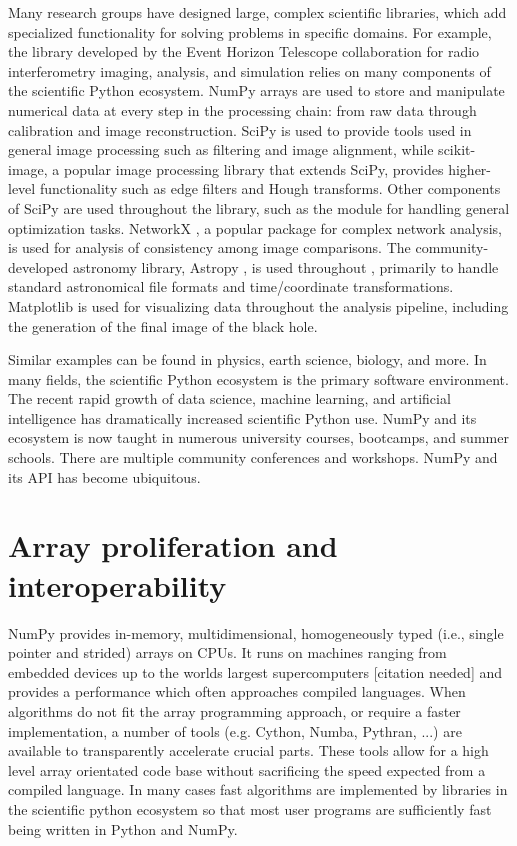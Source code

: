 Many research groups have designed large,
complex scientific libraries, which add specialized functionality for
solving problems in specific domains.
For example, the  library developed by the Event Horizon Telescope 
collaboration for radio interferometry imaging, analysis, and simulation
relies on many components of the scientific Python ecosystem.
NumPy arrays are used to store and manipulate numerical data at every step
in the processing chain: from raw data through calibration and image 
reconstruction.
SciPy is used to provide tools used in general image processing such as 
filtering and image alignment, while scikit-image, a popular image processing
library that extends SciPy, provides higher-level functionality such as
edge filters and Hough transforms.
Other components of SciPy are used throughout the library, such as the
 module for handling general optimization tasks.
NetworkX \cite{SciPyProceedings_11}, a popular package for complex
network analysis, is used for analysis of consistency among image
comparisons.
The community-developed astronomy library, Astropy \cite{astropy:2013, astropy:2018},
is used throughout , primarily to handle standard
astronomical file formats and time/coordinate transformations.
Matplotlib is used for visualizing data throughout the analysis pipeline,
including the generation of the final image of the black hole.

Similar examples can be found in physics, earth science, biology,
and more.
In many fields, the scientific Python ecosystem is the primary
software environment.
The recent rapid growth of data science, machine learning, and
artificial intelligence has dramatically increased scientific
Python use.
NumPy and its ecosystem is now taught in
numerous university courses, bootcamps, and summer schools.
There are multiple community conferences and workshops.
NumPy and its API has become ubiquitous.

\section*{Array proliferation and interoperability}

NumPy provides in-memory, multidimensional, homogeneously typed
(i.e., single pointer and strided) arrays on CPUs.
It runs on machines ranging from embedded devices up to the worlds
largest supercomputers [citation needed] and provides a performance
which often approaches compiled languages.
When algorithms do not fit the array programming approach,
or require a faster implementation,
a number of tools (e.g. Cython, Numba, Pythran, ...)
are available to transparently accelerate crucial parts.
These tools allow for a high level array orientated code base without sacrificing
the speed expected from a compiled language.
In many cases fast algorithms are implemented by libraries in the scientific
python ecosystem so that most user programs are sufficiently fast being
written in Python and NumPy.

